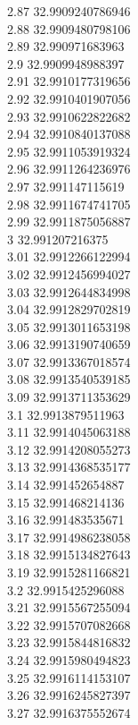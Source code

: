 {2.87	32.9909240786946\\
2.88	32.9909480798106\\
2.89	32.990971683963\\
2.9	32.9909948988397\\
2.91	32.9910177319656\\
2.92	32.9910401907056\\
2.93	32.9910622822682\\
2.94	32.9910840137088\\
2.95	32.9911053919324\\
2.96	32.9911264236976\\
2.97	32.991147115619\\
2.98	32.9911674741705\\
2.99	32.9911875056887\\
3	32.991207216375\\
3.01	32.9912266122994\\
3.02	32.9912456994027\\
3.03	32.9912644834998\\
3.04	32.9912829702819\\
3.05	32.9913011653198\\
3.06	32.9913190740659\\
3.07	32.9913367018574\\
3.08	32.9913540539185\\
3.09	32.9913711353629\\
3.1	32.9913879511963\\
3.11	32.9914045063188\\
3.12	32.9914208055273\\
3.13	32.9914368535177\\
3.14	32.991452654887\\
3.15	32.991468214136\\
3.16	32.991483535671\\
3.17	32.9914986238058\\
3.18	32.9915134827643\\
3.19	32.9915281166821\\
3.2	32.9915425296088\\
3.21	32.9915567255094\\
3.22	32.9915707082668\\
3.23	32.9915844816832\\
3.24	32.9915980494823\\
3.25	32.9916114153107\\
3.26	32.9916245827397\\
3.27	32.9916375552674\\
}
